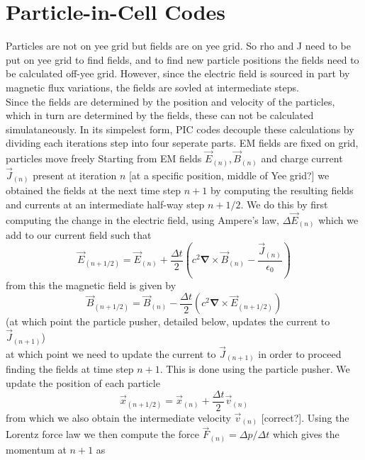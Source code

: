 \section{Particle-in-Cell Codes}
Particles are not on yee grid but fields are on yee grid. So rho and J need to be put on yee grid to find fields, and to find new particle positions the fields need to be calculated off-yee grid. However, since the electric field is sourced in part by magnetic flux variations, the fields are sovled at intermediate steps.\\
Since the fields are determined by the position and velocity of the particles, which in turn are determined by the fields, these can not be calculated simulataneously. In its simpelest form, PIC codes decouple these calculations by dividing each iterations step into four seperate parts.  
EM fields are fixed on grid, particles move freely
\label{sec:Particle-in-Cell Codes}
Starting from EM fields $\vec{E}_{(n)},\vec{B}_{(n)}$ and charge current $\vec{J}_{(n)}$ present at iteration $n$ [at a specific position, middle of Yee grid?] we obtained the fields at the next time step $n+1$ by computing the resulting fields and currents at an intermediate half-way step $n+1/2$. We do this by first computing the change in the electric field, using Ampere's law, $\Delta \vec{E}_{(n)}$ which we add to our current field such that
\begin{equation}
\vec{E}_{(n+1/2)}=\vec{E}_{(n)}+\frac{\Delta t}{2}\left(c^2\mathbf{\nabla}\times \vec{B}_{(n)}-\frac{\vec{J}_{(n)}}{\epsilon_0}\right)
\end{equation}
from this the magnetic field is given by
\begin{equation}
\vec{B}_{(n+1/2)}=\vec{B}_{(n)}-\frac{\Delta t}{2}\left(c^2\mathbf{\nabla}\times \vec{E}_{(n+1/2)}\right)
\end{equation}
(at which point the particle pusher, detailed below, updates the current to $\vec{J}_{(n+1)}$)\\
at which point we need to update the current to $\vec{J}_{(n+1)}$ in order to proceed finding the fields at time step $n+1$. This is done using the particle pusher. We update the position of each particle 
\begin{equation}
\vec{x}_{(n+1/2)}=\vec{x}_{(n)}+\frac{\Delta t}{2}\vec{v}_{(n)}
\end{equation}
from which we also obtain the intermediate velocity $\vec{v}_{(n)}$ [correct?]. Using the Lorentz force law we then compute the force $\vec{F}_{(n)}=\Delta p/\Delta t$ which gives the momentum at $n+1$ as

